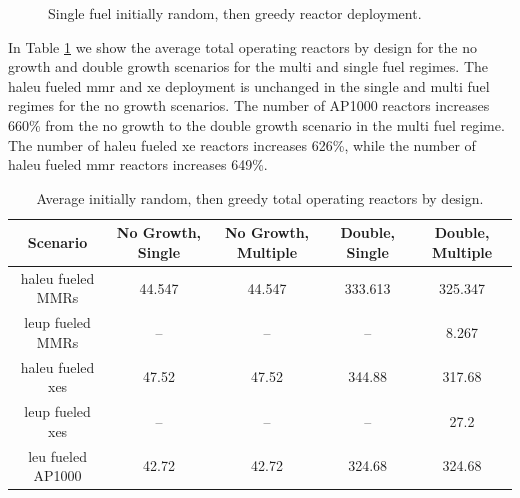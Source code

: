 \begin{figure}[H]
    \hfill
    \caption{Single fuel initially random, then greedy reactor deployment.}
    \label{fig:rand_greed_of_reactors}
\end{figure}

In Table \ref{tab:rand_greed_reac_avg} we show the average total operating
reactors by design for the no growth and double growth scenarios for the multi
and single fuel regimes. The \gls{haleu} fueled \gls{mmr} and \gls{xe}
deployment is unchanged in the single and multi fuel regimes for the no growth
scenarios. The number of AP1000 reactors increases 660\% from the no growth to
the double growth scenario in the multi fuel regime. The number of \gls{haleu}
fueled \gls{xe} reactors increases 626\%, while the number of \gls{haleu}
fueled \gls{mmr} reactors increases 649\%.

\begin{table}[H]
    \centering
    \caption{Average initially random, then greedy total operating reactors by design.}
    \label{tab:rand_greed_reac_avg}
    \begin{tabular}{c c c c c}
       \hline
       Scenario & No Growth, Single & No Growth, Multiple & Double, Single & Double, Multiple  \\
       \hline
       \gls{haleu} fueled MMRs      & 44.547  & 44.547  & 333.613 & 325.347 \\
       \gls{leup} fueled MMRs       & --      & --      & --      & 8.267   \\
       \gls{haleu} fueled \gls{xe}s & 47.52   & 47.52   & 344.88  & 317.68  \\
       \gls{leup} fueled \gls{xe}s  & --      & --      & --      & 27.2    \\
       \gls{leu} fueled AP1000      & 42.72   & 42.72   & 324.68  & 324.68  \\
       \hline
    \end{tabular}
\end{table}

